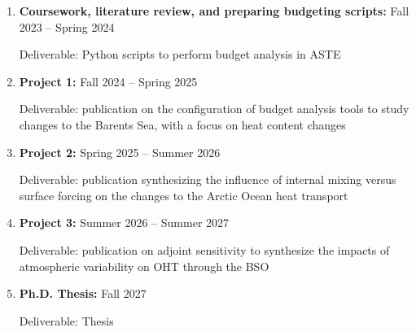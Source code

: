 \documentclass[draft]{agujournal2019}
\begin{document}
    \begin{enumerate}
        \item \textbf{Coursework, literature review, and preparing budgeting scripts:} Fall 2023 -- Spring 2024

        Deliverable: Python scripts to perform budget analysis in ASTE
        
        \item \textbf{Project 1:} Fall 2024 -- Spring 2025
        
        Deliverable: publication on the configuration of budget analysis tools to study changes to the Barents Sea, with a focus on heat content changes
        
        \item \textbf{Project 2:} Spring 2025 -- Summer 2026

        Deliverable: publication synthesizing the influence of internal mixing versus surface forcing on the changes to the Arctic Ocean heat transport 

        \item \textbf{Project 3:} Summer 2026 -- Summer 2027

        Deliverable: publication on adjoint sensitivity to synthesize the impacts of atmospheric variability on OHT through the BSO

        \item \textbf{Ph.D. Thesis:} Fall 2027

        Deliverable: Thesis
    \end{enumerate}







%
%
\end{document}
